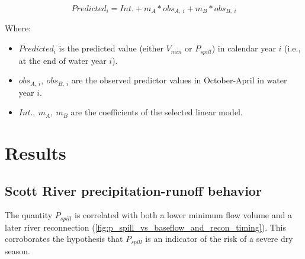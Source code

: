 \documentclass[hess, manuscript]{copernicus}
\providecommand{\tightlist}{%
  \setlength{\itemsep}{0pt}\setlength{\parskip}{0pt}}
\begin{document}
\begin{equation}
Predicted_{i} = Int. + m_A * obs_{A,~i}+m_B*obs_{B,~i}
\end{equation}

Where:

\begin{itemize}
\tightlist
\item
  \(Predicted_i\) is the predicted value (either \(V_{min}\) or
  \(P_{spill}\)) in calendar year \(i\) (i.e., at the end of water year
  \(i\)).
\item
  \(obs_{A,~i},~obs_{B,~i}\) are the observed predictor values in
  October-April in water year \(i\).
\item
  \(Int.,~m_A,~m_B\) are the coefficients of the selected linear model.
\end{itemize}

\section{Results}

\subsection{Scott River precipitation-runoff behavior}

The quantity \(P_{spill}\) is correlated with both a lower minimum flow
volume and a later river reconnection
(\autoref{fig:p_spill_vs_baseflow_and_recon_timing}). This corroborates
the hypothesis that \(P_{spill}\) is an indicator of the risk of a
severe dry season.
\end{document}
